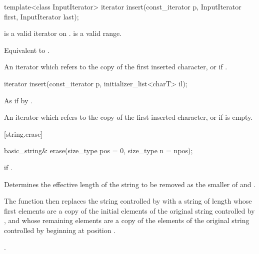 %
\begin{itemdecl}
template<class InputIterator>
  iterator insert(const_iterator p, InputIterator first, InputIterator last);
\end{itemdecl}

\begin{itemdescr}
\pnum
\requires
{} is a valid iterator on
.
\tcode{[first, last)}
is a valid range.

\pnum
\effects
Equivalent to
.

\pnum
\returns An iterator which refers to the copy of the first inserted character, or
 if .
\end{itemdescr}

%
\begin{itemdecl}
iterator insert(const_iterator p, initializer_list<charT> il);
\end{itemdecl}

\begin{itemdescr}
\pnum
\effects As if by .

\pnum
\returns An iterator which refers to the copy of the first inserted character, or
 if  is empty.
\end{itemdescr}

[string.erase]{}

%
\begin{itemdecl}
basic_string& erase(size_type pos = 0, size_type n = npos);
\end{itemdecl}

\begin{itemdescr}
\pnum
\throws
{}
if 
.

\pnum
\effects
Determines the effective length 
of the string to be removed as the smaller of  and
.

\pnum
The function then replaces the string controlled by
with a string of length
whose first  elements are a copy of the initial elements of the original string controlled by
,
and whose remaining elements are a copy of the elements of the original string controlled by
beginning at position
.

\pnum
\returns
{}.
\end{itemdescr}

